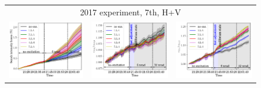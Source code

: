 \documentclass[aps
,prstab
,reprint
,longbibliography
,preprintnumbers
,showkeys
,amsfonts,amssymb,amsmath
,floatfix
]{revtex4-1}
\newlength{\thirdwidth}
\begin{document}
\begin{figure}
\begin{tabular}{ccc}
    \multicolumn{3}{c}{2017 experiment, 7th, H+V} \\
    \includegraphics[width=\thirdwidth]{2017_bunch_intensity_hv7th_no_damper_avg.png} &
    \includegraphics[width=\thirdwidth]{2017_emith_avg_rel_hv7th_no_damper.png} &
    \includegraphics[width=\thirdwidth]{2017_emitv_avg_rel_hv7th_no_damper.png} \\

\end{tabular}
\end{figure}
\end{document}

